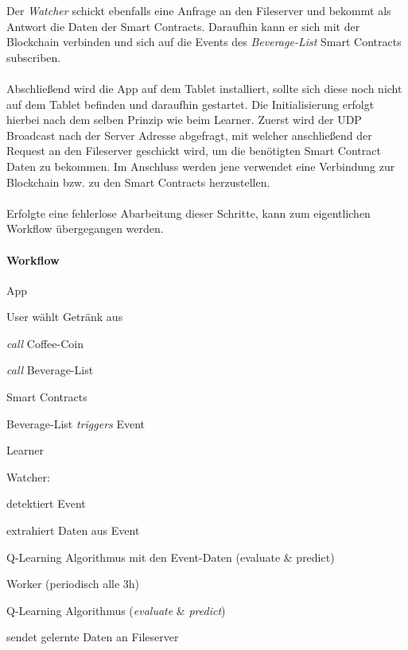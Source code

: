 Der \textit{Watcher} schickt ebenfalls eine Anfrage an den Fileserver und bekommt als Antwort die Daten der Smart Contracts. Daraufhin kann er sich mit der Blockchain verbinden und sich auf die Events des \textit{Beverage-List} Smart Contracts subscriben.\\\\
Abschließend wird die App auf dem Tablet installiert, sollte sich diese noch nicht auf dem Tablet befinden und daraufhin gestartet. Die Initialisierung erfolgt hierbei nach dem selben Prinzip wie beim Learner. Zuerst wird der UDP Broadcast nach der Server Adresse abgefragt, mit welcher anschließend der Request an den Fileserver geschickt wird, um die benötigten Smart Contract Daten zu bekommen. Im Anschluss werden jene verwendet eine Verbindung zur Blockchain bzw. zu den Smart Contracts herzustellen.
\\\\
Erfolgte eine fehlerlose Abarbeitung dieser Schritte, kann zum eigentlichen Workflow übergegangen werden.
\clearpage
\paragraph{Workflow}
\begin{legal}
	\item {App}
	\begin{legal}
		\item User wählt Getränk aus
		\item \textit{call} Coffee-Coin
		\item \textit{call} Beverage-List
	\end{legal}
				      	       	                            
	\item Smart Contracts
	\begin{legal}
		\item Beverage-List \textit{triggers} Event
	\end{legal}
				      	       	                              
	\item Learner
	\begin{legal}
		\item Watcher:
		\begin{legal}
			\item detektiert Event
			\item extrahiert Daten aus Event
			\item {} Q-Learning Algorithmus mit den Event-Daten (evaluate \& predict)
		\end{legal}
		\item Worker (periodisch alle 3h)
		\begin{legal}
			\item {} Q-Learning Algorithmus (\textit{evaluate} \& \textit{predict})
			\item sendet gelernte Daten an Fileserver
		\end{legal}
	\end{legal}
\end{legal}

